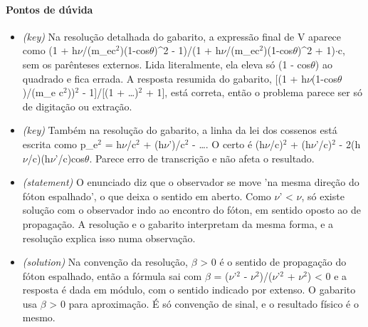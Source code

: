 \documentclass{article}%
\begin{document}
\paragraph{Pontos de dúvida}%
\begin{itemize}%
\item%
\textit{(key)} Na resolução detalhada do gabarito, a expressão final de V aparece como (1 + h$\nu$/(m\_ec$^2$)(1-cos$\theta$)\^{}2 - 1)/(1 + h$\nu$/(m\_ec$^2$)(1-cos$\theta$)\^{}2 + 1)$\cdot$c, sem os parênteses externos. Lida literalmente, ela eleva só (1 - cos$\theta$) ao quadrado e fica errada. A resposta resumida do gabarito, {[}(1 + h$\nu$(1-cos$\theta$)/(m\_e c$^2$))$^2$ - 1{]}/{[}(1 + \ldots{})$^2$ + 1{]}, está correta, então o problema parece ser só de digitação ou extração.%
\item%
\textit{(key)} Também na resolução do gabarito, a linha da lei dos cossenos está escrita como p\_e$^2$ = h$\nu$/c$^2$ + (h$\nu$')/c$^2$ - \ldots{}. O certo é (h$\nu$/c)$^2$ + (h$\nu$'/c)$^2$ - 2(h$\nu$/c)(h$\nu$'/c)cos$\theta$. Parece erro de transcrição e não afeta o resultado.%
\item%
\textit{(statement)} O enunciado diz que o observador se move 'na mesma direção do fóton espalhado', o que deixa o sentido em aberto. Como $\nu$' < $\nu$, só existe solução com o observador indo ao encontro do fóton, em sentido oposto ao de propagação. A resolução e o gabarito interpretam da mesma forma, e a resolução explica isso numa observação.%
\item%
\textit{(solution)} Na convenção da resolução, $\beta$ > 0 é o sentido de propagação do fóton espalhado, então a fórmula sai com $\beta$ = ($\nu$'$^2$ - $\nu$$^2$)/($\nu$'$^2$ + $\nu$$^2$) < 0 e a resposta é dada em módulo, com o sentido indicado por extenso. O gabarito usa $\beta$ > 0 para aproximação. É só convenção de sinal, e o resultado físico é o mesmo.%
\end{itemize}%
\end{document}
